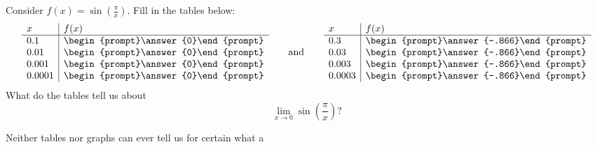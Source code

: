 \documentclass{ximera}
\begin{document}
\begin{question}
  Consider $f(x) = \sin\left(\frac{\pi}{x}\right)$. Fill in the 
  tables below:
  \[
  \begin{array}{l|l}
    x      & f(x)      \\ \hline
    0.1    & \begin{prompt}\answer{0}\end{prompt}\\
    0.01   & \begin{prompt}\answer{0}\end{prompt}\\
    0.001  & \begin{prompt}\answer{0}\end{prompt}\\
    0.0001 & \begin{prompt}\answer{0}\end{prompt} 
  \end{array}
  \qquad\text{and}\qquad
  \begin{array}{l|l}
    x      & f(x)            \\ \hline
    0.3    &  \begin{prompt}\answer{-.866}\end{prompt} \\
    0.03   &  \begin{prompt}\answer{-.866}\end{prompt} \\
    0.003  &  \begin{prompt}\answer{-.866}\end{prompt} \\
    0.0003 &  \begin{prompt}\answer{-.866}\end{prompt}
  \end{array}
  \]
  What do the tables tell us about
  \[
  \lim_{x\to 0}\sin\left(\frac{\pi}{x}\right)?
  \]
  \begin{multipleChoice}
  \end{multipleChoice}
  \begin{feedback}
    Neither tables nor graphs can ever tell us for certain what a

\end{feedback}
\end{question}
\end{document}
